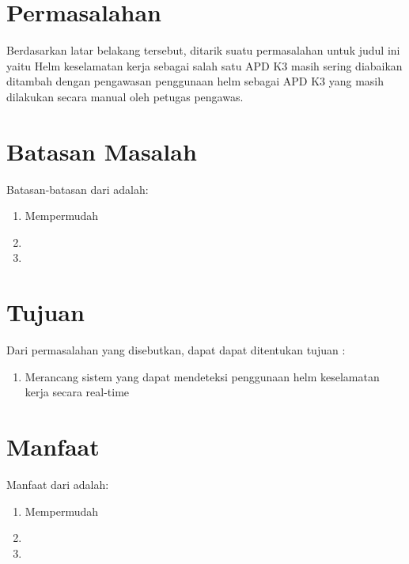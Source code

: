 \section{Permasalahan}
\label{sec:permasalahan}

Berdasarkan latar belakang tersebut, ditarik suatu permasalahan untuk judul ini yaitu Helm keselamatan kerja sebagai salah satu APD K3 masih sering diabaikan ditambah dengan pengawasan penggunaan helm sebagai APD K3 yang masih dilakukan secara manual oleh petugas pengawas.


\section{Batasan Masalah}
\label{sec:batasanmasalah}

Batasan-batasan dari \lipsum[1][1-3] adalah:

\begin{enumerate}[nolistsep]

  \item Mempermudah \lipsum[2][1-3]

  \item \lipsum[3][1-5]

  \item \lipsum[4][1-5]

\end{enumerate}

\section{Tujuan}
\label{sec:Tujuan}

Dari permasalahan yang disebutkan, dapat dapat ditentukan tujuan :

\begin{enumerate}[nolistsep]

  \item Merancang sistem yang dapat mendeteksi penggunaan helm keselamatan kerja secara real-time

\end{enumerate}

\section{Manfaat}
\label{sec:manfaat}

Manfaat dari \lipsum[1][1-3] adalah:

\begin{enumerate}[nolistsep]

  \item Mempermudah \lipsum[2][1-3]

  \item \lipsum[3][1-5]

  \item \lipsum[4][1-5]

\end{enumerate}

